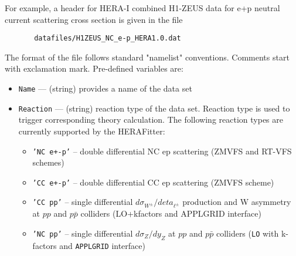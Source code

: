 \documentclass[11pt,a4paper]{article}
\begin{document}
   For example, a header for HERA-I combined H1-ZEUS data for e+p neutral 
   current scattering cross section is given in the file

\begin{verbatim}
       datafiles/H1ZEUS_NC_e-p_HERA1.0.dat
\end{verbatim}

   The format of the file follows standard "namelist" conventions. Comments 
   start with exclamation mark.  Pre-defined variables are:
\begin{itemize}
     \item{\tt Name}        --- (string) provides a name of the data set
    \item{\tt  Reaction}    --- (string) reaction type of the data set. Reaction type is used 
                      to trigger corresponding theory calculation. The following 
                      reaction types  are currently supported by the HERAFitter:
                      \begin{itemize}
                        \item {\tt 'NC e+-p'}  -- double differential NC ep scattering
                                      (ZMVFS and RT-VFS schemes) 
                        \item {\tt 'CC e+-p'}  -- double differential CC ep scattering
                                      (ZMVFS scheme)
                        \item {\tt 'CC pp'}    -- single differential $d \sigma_{W^{\pm}}/d eta_{\ell^{\pm}}$
                                      production and W asymmetry at $pp$ and $p\bar{p}$ 
                                      colliders (LO+kfactors and APPLGRID interface)
                        \item {\tt 'NC pp'}    -- single differential $d \sigma_Z / d y_Z$ at $pp$ and
                                      $p\bar{p}$ colliders
                                      ({\tt LO} with k-factors and {\tt APPLGRID} interface)


\end{itemize}
\end{itemize}
\end{document}
